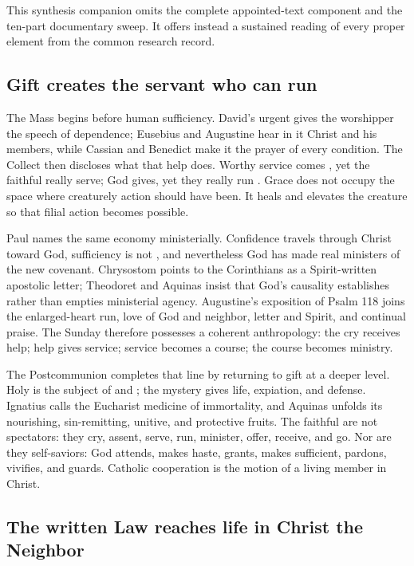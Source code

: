 This synthesis companion omits the complete appointed-text component and the
ten-part documentary sweep. It offers instead a sustained reading of every
proper element from the common research record.

\subsection*{Gift creates the servant who can run \enspace{}}

The Mass begins before human sufficiency. David's urgent
 gives the worshipper the speech of dependence;
Eusebius and Augustine hear in it Christ and his members, while Cassian and
Benedict make it the prayer of every condition. The Collect then discloses
what that help does. Worthy service comes , yet the
faithful really serve; God gives, yet they really run
. Grace does not occupy the space where creaturely
action should have been. It heals and elevates the creature so that filial
action becomes possible.

Paul names the same economy ministerially. Confidence travels through Christ
toward God, sufficiency is not , and nevertheless God
has made real ministers of the new covenant. Chrysostom points to the
Corinthians as a Spirit-written apostolic letter; Theodoret and Aquinas insist
that God's causality establishes rather than empties ministerial agency.
Augustine's exposition of Psalm 118 joins the enlarged-heart run, love of God
and neighbor, letter and Spirit, and continual praise. The Sunday therefore
possesses a coherent anthropology: the cry receives help; help gives service;
service becomes a course; the course becomes ministry.

The Postcommunion completes that line by returning to gift at a deeper level.
Holy  is the subject of  and
; the mystery gives life, expiation, and defense. Ignatius calls
the Eucharist medicine of immortality, and Aquinas unfolds its nourishing,
sin-remitting, unitive, and protective fruits. The faithful are not spectators:
they cry, assent, serve, run, minister, offer, receive, and go. Nor are they
self-saviors: God attends, makes haste, grants, makes sufficient, pardons,
vivifies, and guards. Catholic cooperation is the motion of a living member in
Christ.

\subsection*{The written Law reaches life in Christ the Neighbor \enspace{}}

